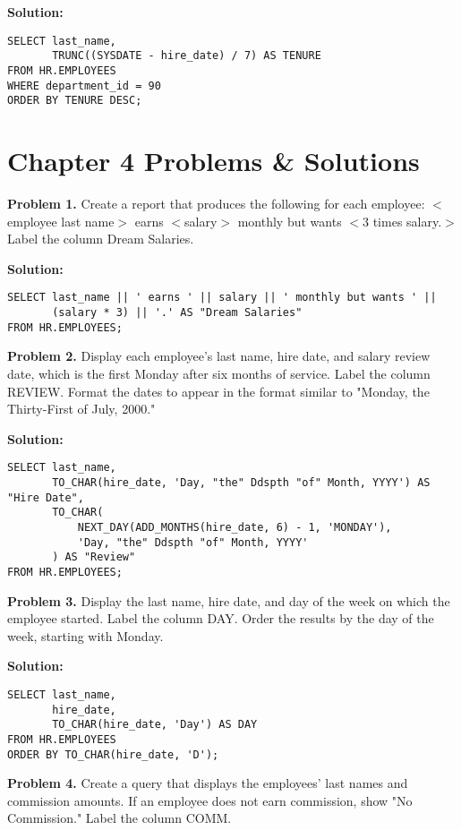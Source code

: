 \documentclass[12pt,a4paper]{article}
\begin{document}
\textbf{Solution:}
\begin{lstlisting}[style=sqlstyle]
SELECT last_name,
       TRUNC((SYSDATE - hire_date) / 7) AS TENURE
FROM HR.EMPLOYEES
WHERE department_id = 90
ORDER BY TENURE DESC;
\end{lstlisting}

\section{Chapter 4 Problems \& Solutions}

\textbf{Problem 1.} Create a report that produces the following for each employee: $<$employee last name$>$ earns $<$salary$>$ monthly but wants $<$3 times salary.$>$ Label the column Dream Salaries.

\textbf{Solution:}
\begin{lstlisting}[style=sqlstyle]
SELECT last_name || ' earns ' || salary || ' monthly but wants ' || 
       (salary * 3) || '.' AS "Dream Salaries"
FROM HR.EMPLOYEES;
\end{lstlisting}

\textbf{Problem 2.} Display each employee's last name, hire date, and salary review date, which is the first Monday after six months of service. Label the column REVIEW. Format the dates to appear in the format similar to "Monday, the Thirty-First of July, 2000."

\textbf{Solution:}
\begin{lstlisting}[style=sqlstyle]
SELECT last_name,
       TO_CHAR(hire_date, 'Day, "the" Ddspth "of" Month, YYYY') AS "Hire Date",
       TO_CHAR(
           NEXT_DAY(ADD_MONTHS(hire_date, 6) - 1, 'MONDAY'),
           'Day, "the" Ddspth "of" Month, YYYY'
       ) AS "Review"
FROM HR.EMPLOYEES;
\end{lstlisting}

\textbf{Problem 3.} Display the last name, hire date, and day of the week on which the employee started. Label the column DAY. Order the results by the day of the week, starting with Monday.

\textbf{Solution:}
\begin{lstlisting}[style=sqlstyle]
SELECT last_name,
       hire_date,
       TO_CHAR(hire_date, 'Day') AS DAY
FROM HR.EMPLOYEES
ORDER BY TO_CHAR(hire_date, 'D');
\end{lstlisting}

\textbf{Problem 4.} Create a query that displays the employees' last names and commission amounts. If an employee does not earn commission, show "No Commission." Label the column COMM.
\end{document}
